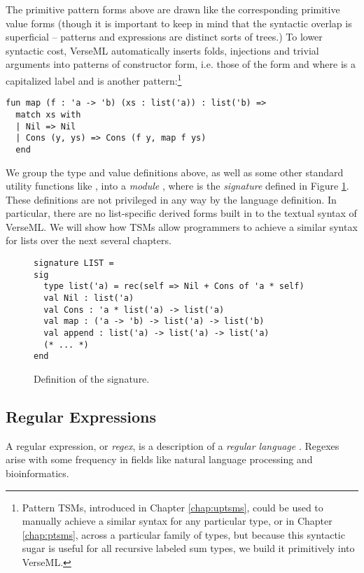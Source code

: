 The primitive pattern forms above are drawn like the corresponding primitive value forms (though it is important to keep in mind that the syntactic overlap is superficial -- patterns and expressions are distinct sorts of trees.) To lower syntactic cost, VerseML automatically inserts folds, injections and trivial arguments into patterns of constructor form, i.e. those of the form  and  where  is a capitalized label and  is another pattern:\footnote{Pattern TSMs, introduced in Chapter \ref{chap:uptsms}, could be used to manually achieve a similar syntax for any particular type, or in Chapter \ref{chap:ptsms}, across a particular family of types, but because this syntactic sugar is useful for all recursive labeled sum types, we build it primitively into VerseML.}
\begin{lstlisting}[numbers=none]
fun map (f : 'a -> 'b) (xs : list('a)) : list('b) => 
  match xs with 
  | Nil => Nil 
  | Cons (y, ys) => Cons (f y, map f ys)
  end
\end{lstlisting}

We group the type and value definitions above, as well as some other standard utility functions like , into a \emph{module} , where  is the \emph{signature} defined in Figure \ref{fig:LIST}. These definitions are not privileged in any way by the language definition. In particular, there are no list-specific derived forms built in to the textual syntax of VerseML. We will show how TSMs allow programmers to achieve a similar syntax for lists over the next several chapters.

\begin{figure}[h!]
\begin{lstlisting}[numbers=none]
signature LIST = 
sig 
  type list('a) = rec(self => Nil + Cons of 'a * self)
  val Nil : list('a)
  val Cons : 'a * list('a) -> list('a)
  val map : ('a -> 'b) -> list('a) -> list('b)
  val append : list('a) -> list('a) -> list('a)
  (* ... *)
end
\end{lstlisting}
\caption{Definition of the  signature.}
\label{fig:LIST}
\end{figure}

\subsection{Regular Expressions}\label{sec:syntax-examples-regexps}
A regular expression, or \emph{regex}, is a description of a \emph{regular language} \cite{Thompson:1968:PTR:363347.363387}. Regexes arise with some frequency in fields like natural language processing and bioinformatics.


